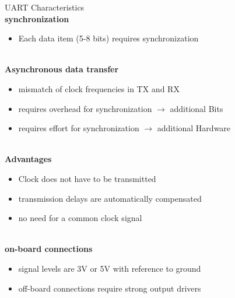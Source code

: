 \begin{concept}{UART Characteristics}
    \vspace{2mm}\\
    \textbf{synchronization}
    \begin{itemize}
        \item Each data item (5-8 bits) requires synchronization
    \end{itemize}
    \vspace{2mm}\\
    \textbf{Asynchronous data transfer}
    \begin{itemize}
        \item mismatch of clock frequencies in TX and RX
        \item requires overhead for synchronization $\rightarrow$ additional Bits
        \item requires effort for synchronization $\rightarrow$ additional Hardware
    \end{itemize}
    \vspace{2mm}\\
    \textbf{Advantages}
    \begin{itemize}
        \item Clock does not have to be transmitted
        \item transmission delays are automatically compensated
        \item no need for a common clock signal
    \end{itemize}
    \vspace{2mm}\\
    \textbf{on-board connections}
    \begin{itemize}
        \item signal levels are 3V or 5V with reference to ground
        \item off-board connections require strong output drivers
    \end{itemize}
\end{concept}

    